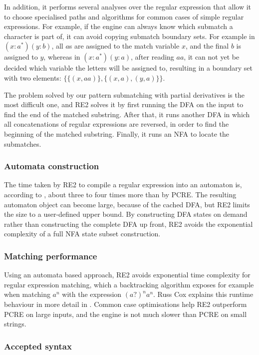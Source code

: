 In addition, it performs several analyses over the regular expression that allow
it to choose specialised paths and algorithms for common cases of simple regular
expressions. For example, if the engine can always know which submatch a
character is part of, it can avoid copying submatch boundary sets. For example
in $(x:a^*)(y:b)$, all $a$s are assigned to the match variable $x$, and the
final $b$ is assigned to $y$, whereas in $(x:a^*)(y:a)$, after reading $aa$, it
can not yet be decided which variable the letters will be assigned to, resulting
in a boundary set with two elements: $\{\{(x,aa)\},\{(x,a),(y,a)\}\}$.

The problem solved by our pattern submatching with partial derivatives is the
most difficult one, and RE2 solves it by first running the DFA on the input to
find the end of the matched substring. After that, it runs another DFA in which
all concatenations of regular expressions are reversed, in order to find the
beginning of the matched substring. Finally, it runs an NFA to locate the
submatches.


\subsubsection{Automata construction}

The time taken by RE2 to compile a regular expression into an automaton is,
according to \cite{regexp3}, about three to four times more than by PCRE. The
resulting automaton object can become large, because of the cached DFA, but RE2
limits the size to a user-defined upper bound. By constructing DFA states on
demand rather than constructing the complete DFA up front, RE2 avoids the
exponential complexity of a full NFA state subset construction.


\subsubsection{Matching performance}

Using an automata based approach, RE2 avoids exponential time complexity for
regular expression matching, which a backtracking algorithm exposes for example
when matching $a^n$ with the expression $(a?)^na^n$. Russ Cox explains this
runtime behaviour in more detail in \cite{regexp1}. Common case optimisations
help RE2 outperform PCRE on large inputs, and the engine is not much slower than
PCRE on small strings.


\subsubsection{Accepted syntax}

